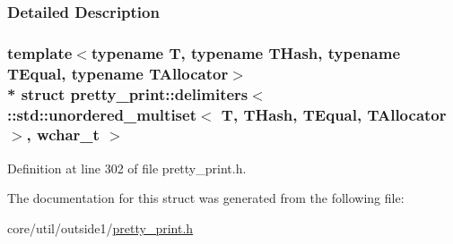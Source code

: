 \subsubsection{Detailed Description}
\subsubsection*{template$<$typename T, typename T\+Hash, typename T\+Equal, typename T\+Allocator$>$\\*
struct pretty\+\_\+print\+::delimiters$<$ \+::std\+::unordered\+\_\+multiset$<$ T, T\+Hash, T\+Equal, T\+Allocator $>$, wchar\+\_\+t $>$}



Definition at line 302 of file pretty\+\_\+print.\+h.



The documentation for this struct was generated from the following file\+:\begin{DoxyCompactItemize}
\item 
core/util/outside1/\hyperlink{pretty__print_8h}{pretty\+\_\+print.\+h}\end{DoxyCompactItemize}
